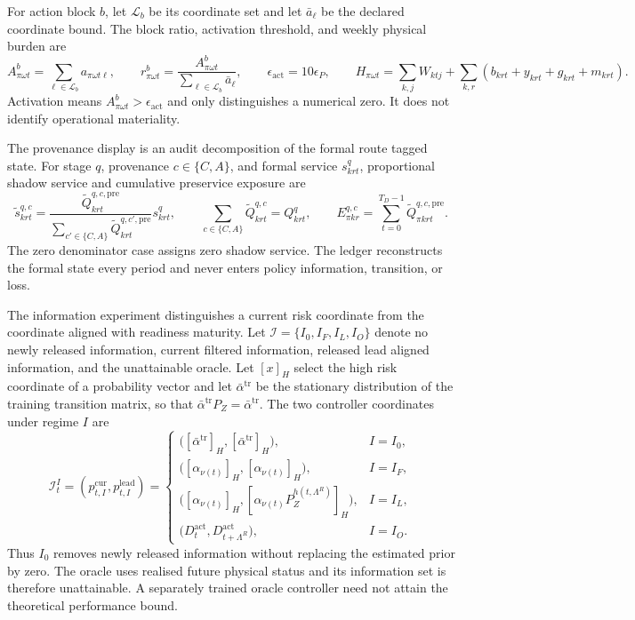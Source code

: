 \documentclass[a4paper,fleqn]{cas-sc}
\begin{document}
For action block $b$, let $\mathcal L_b$ be its coordinate set and let
$\bar a_{\ell}$ be the declared coordinate bound. The block ratio, activation
threshold, and weekly physical burden are
\begin{equation}
 A^b_{\pi\omega t}=\sum_{\ell\in\mathcal L_b}a_{\pi\omega t\ell},
 \qquad
 r^b_{\pi\omega t}=\frac{A^b_{\pi\omega t}}
 {\sum_{\ell\in\mathcal L_b}\bar a_{\ell}},
 \qquad
 \epsilon_{\mathrm{act}}=10\epsilon_P,
 \qquad
 H_{\pi\omega t}=\sum_{k,j}W_{ktj}
 +\sum_{k,r}(b_{krt}+y_{krt}+g_{krt}+m_{krt}).
 \label{eq:mechanism-action-burden}
\end{equation}
Activation means $A^b_{\pi\omega t}>\epsilon_{\mathrm{act}}$ and only
distinguishes a numerical zero. It does not identify operational materiality.

The provenance display is an audit decomposition of the formal route tagged
state. For stage $q$, provenance $c\in\{C,A\}$, and formal service
$s^q_{krt}$, proportional shadow service and cumulative preservice exposure are
\begin{equation}
 \widetilde s^{q,c}_{krt}
 =\frac{\widetilde Q^{q,c,\mathrm{pre}}_{krt}}
 {\sum_{c'\in\{C,A\}}\widetilde Q^{q,c',\mathrm{pre}}_{krt}}
 s^q_{krt},
 \qquad
 \sum_{c\in\{C,A\}}\widetilde Q^{q,c}_{krt}=Q^q_{krt},
 \qquad
 E^{q,c}_{\pi kr}=\sum_{t=0}^{T_D-1}
 \widetilde Q^{q,c,\mathrm{pre}}_{\pi krt}.
 \label{eq:mechanism-provenance-exposure}
\end{equation}
The zero denominator case assigns zero shadow service. The ledger reconstructs
the formal state every period and never enters policy information, transition,
or loss.

The information experiment distinguishes a current risk coordinate from the
coordinate aligned with readiness maturity. Let
$\mathcal I=\{I_0,I_F,I_L,I_O\}$ denote no newly released information, current
filtered information, released lead aligned information, and the unattainable
oracle. Let $[x]_{H}$ select the high risk coordinate of a probability vector
and let $\bar\alpha^{\mathrm{tr}}$ be the stationary distribution of the
training transition matrix, so that
$\bar\alpha^{\mathrm{tr}}P_Z=\bar\alpha^{\mathrm{tr}}$. The two controller
coordinates under regime $I$ are
\begin{equation}
 \mathcal I_t^I=(p^{\mathrm{cur}}_{t,I},p^{\mathrm{lead}}_{t,I})=
 \begin{cases}
 \bigl([\bar\alpha^{\mathrm{tr}}]_{H},
       [\bar\alpha^{\mathrm{tr}}]_{H}\bigr),&I=I_0,\\
 \bigl([\alpha_{\nu(t)}]_{H},
       [\alpha_{\nu(t)}]_{H}\bigr),&I=I_F,\\
 \bigl([\alpha_{\nu(t)}]_{H},
       [\alpha_{\nu(t)}P_Z^{h(t,\Lambda^R)}]_{H}\bigr),&I=I_L,\\
 \bigl(D_t^{\mathrm{act}},D_{t+\Lambda^R}^{\mathrm{act}}\bigr),&I=I_O.
 \end{cases}
 \label{eq:information-regimes-524}
\end{equation}
Thus $I_0$ removes newly released information without replacing the estimated
prior by zero. The oracle uses realised future physical status and its
information set is therefore unattainable. A separately trained oracle
controller need not attain the theoretical performance bound.
\end{document}
